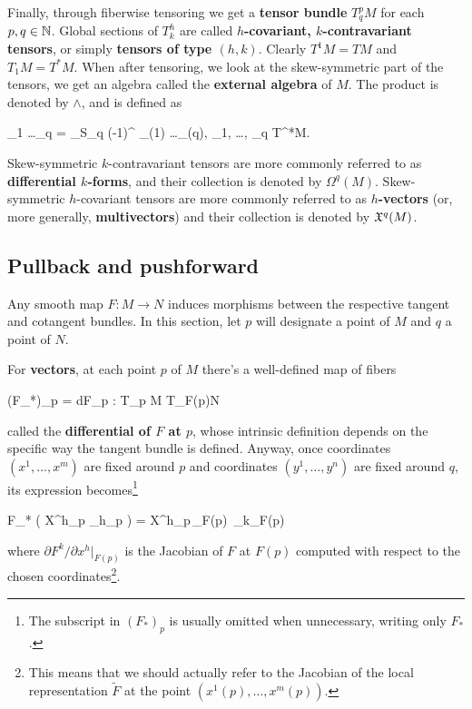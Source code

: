 \documentclass[main.tex]{subfiles}
\begin{document}
Finally, through fiberwise tensoring we get a \textbf{tensor bundle} $T^p_q M$ for each $p, q \in \mathbb{N}$. Global sections of $T^h_k$ are called \textbf{$h$-covariant, $k$-contravariant tensors}, or simply \textbf{tensors of type $(h, k)$}. Clearly $T^1 M = TM$ and $T_1 M = T^* M$. When after tensoring, we look at the skew-symmetric part of the tensors, we get an algebra called the \textbf{external algebra} of $M$. The product is denoted by $\wedge$, and is defined as
\begin{eqalign}
	\xi_1 \wedge \ldots \wedge \xi_q = \sum_{\sigma \in S_q} (-1)^{\sign \sigma} \xi_{\sigma(1)} \tens \ldots \tens \xi_{\sigma(q)}, \quad \forall \xi_1, \ldots, \xi_q \in T^*M.
\end{eqalign}
Skew-symmetric $k$-contravariant tensors are more commonly referred to as \textbf{differential $k$-forms}, and their collection is denoted by $\Omega^q(M)$. Skew-symmetric $h$-covariant tensors are more commonly referred to as \textbf{$h$-vectors} (or, more generally, \textbf{multivectors}) and their collection is denoted by $\mathfrak{X}^q(M)$.

\subsection{Pullback and pushforward}
Any smooth map $F: M \to N$ induces morphisms between the respective tangent and cotangent bundles. In this section, let $p$ will designate a point of $M$ and $q$ a point of $N$.

\begin{construction}
\label{const:diff_at_P}
	For \textbf{vectors}, at each point $p$ of $M$ there's a well-defined map of fibers
	\begin{eqalign}
		(F_*)_p = dF_p : T_p M \to T_{F(p)}N
	\end{eqalign}
	called the \textbf{differential of $F$ at $p$}, whose intrinsic definition depends on the specific way the tangent bundle is defined. Anyway, once coordinates $(x^1, \ldots, x^m)$ are fixed around $p$ and coordinates $(y^1, \ldots, y^n)$ are fixed around $q$, its expression becomes\footnote{The subscript in $(F_*)_p$ is usually omitted when unnecessary, writing only $F_*$.}
	\begin{eqalign}
		F_* \left( X^h\vert_p \partial_h\vert_p \right) = X^h\vert_p\,\vert_{F(p)}\, \partial_k\vert_{F(p)}
	\end{eqalign}
	where $\partial F^k /\partial x^h \vert_{F(p)}$ is the Jacobian of $F$ at $F(p)$ computed with respect to the chosen coordinates\footnote{This means that we should actually refer to the Jacobian of the local representation $\tilde F$ at the point $(x^1(p),\ldots,x^m(p))$.}.
\end{construction}
\end{document}
